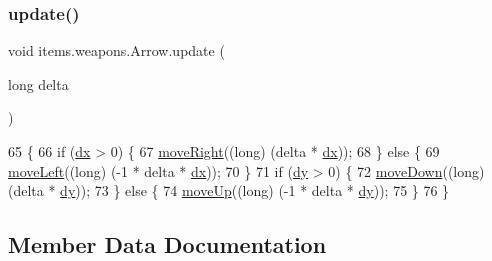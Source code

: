 \subsubsection{\texorpdfstring{update()}{update()}}
{\footnotesize\ttfamily void items.\+weapons.\+Arrow.\+update (\begin{DoxyParamCaption}\item[{long}]{delta }\end{DoxyParamCaption})\hspace{0.3cm}{\ttfamily [inline]}}


\begin{DoxyCode}
65                                    \{
66         \textcolor{keywordflow}{if} (\mbox{\hyperlink{classitems_1_1weapons_1_1_arrow_ad0f19f917fe7af158738ad8dadc0d0eb}{dx}} > 0) \{
67             \mbox{\hyperlink{classentities_1_1_mobile_entity_a5b26e1dec0828ec7079ec5d29ecf4f30}{moveRight}}((\textcolor{keywordtype}{long}) (delta * \mbox{\hyperlink{classitems_1_1weapons_1_1_arrow_ad0f19f917fe7af158738ad8dadc0d0eb}{dx}}));
68         \} \textcolor{keywordflow}{else} \{
69             \mbox{\hyperlink{classentities_1_1_mobile_entity_aee779d276685e05da66f3d1203535838}{moveLeft}}((\textcolor{keywordtype}{long}) (-1 * delta * \mbox{\hyperlink{classitems_1_1weapons_1_1_arrow_ad0f19f917fe7af158738ad8dadc0d0eb}{dx}}));
70         \}
71         \textcolor{keywordflow}{if} (\mbox{\hyperlink{classitems_1_1weapons_1_1_arrow_a41b7f69adb414e3b19c40785b6225b9c}{dy}} > 0) \{
72             \mbox{\hyperlink{classentities_1_1_mobile_entity_a0017810fbe9ef38039f90044cdecb2e6}{moveDown}}((\textcolor{keywordtype}{long}) (delta * \mbox{\hyperlink{classitems_1_1weapons_1_1_arrow_a41b7f69adb414e3b19c40785b6225b9c}{dy}}));
73         \} \textcolor{keywordflow}{else} \{
74             \mbox{\hyperlink{classentities_1_1_mobile_entity_afa8c8461f80d4c39aef4a66d483a8b8a}{moveUp}}((\textcolor{keywordtype}{long}) (-1 * delta * \mbox{\hyperlink{classitems_1_1weapons_1_1_arrow_a41b7f69adb414e3b19c40785b6225b9c}{dy}}));
75         \}
76     \}
\end{DoxyCode}


\subsection{Member Data Documentation}
\mbox{\label{classitems_1_1weapons_1_1_arrow_a53eef20648312917e2c7b4405cd24c2c}} 
